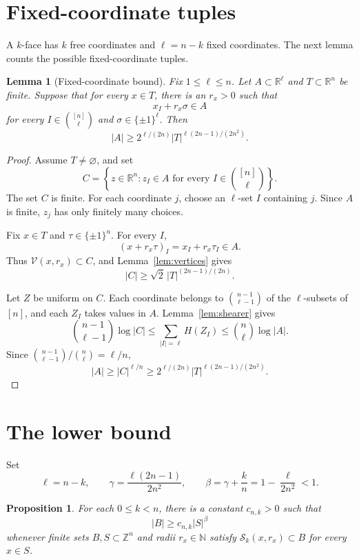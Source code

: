 \documentclass[11pt]{amsart}
\numberwithin{equation}{section}
\theoremstyle{plain}
\newtheorem{lemma}[theorem]{Lemma}
\newtheorem{proposition}[theorem]{Proposition}
\theoremstyle{definition}
\newcommand{\R}{\mathbb{R}}
\newcommand{\Z}{\mathbb{Z}}
\newcommand{\N}{\mathbb{N}}
\newcommand{\cS}{\mathcal{S}}
\begin{document}
\section{Fixed-coordinate tuples}

A $k$-face has $k$ free coordinates and $\ell=n-k$ fixed coordinates.  The
next lemma counts the possible fixed-coordinate tuples.

\begin{lemma}[Fixed-coordinate bound]\label{lem:fixed}
Fix $1\leq\ell\leq n$.  Let $A\subset\R^\ell$ and $T\subset\R^n$ be finite.
Suppose that for every $x\in T$, there is an $r_x>0$ such that
\[
 x_I+r_x\sigma\in A
\]
for every $I\in\binom{[n]}{\ell}$ and $\sigma\in\{\pm1\}^\ell$.  Then
\[
 |A|\geq
 2^{\ell/(2n)}|T|^{\ell(2n-1)/(2n^2)}.
\]
\end{lemma}

\begin{proof}
Assume $T\neq\varnothing$, and set
\[
 C=\left\{z\in\R^n:z_I\in A
 \text{ for every }I\in\binom{[n]}{\ell}\right\}.
\]
The set $C$ is finite.  For each coordinate $j$, choose an $\ell$-set $I$
containing $j$.  Since $A$ is finite, $z_j$ has only finitely many choices.

Fix $x\in T$ and $\tau\in\{\pm1\}^n$.  For every $I$,
\[
 (x+r_x\tau)_I=x_I+r_x\tau_I\in A.
\]
Thus $\mathcal V(x,r_x)\subset C$, and Lemma~\ref{lem:vertices} gives
\[
 |C|\geq\sqrt2\,|T|^{(2n-1)/(2n)}.
\]

Let $Z$ be uniform on $C$.  Each coordinate belongs to
$\binom{n-1}{\ell-1}$ of the $\ell$-subsets of $[n]$, and each $Z_I$ takes
values in $A$.  Lemma~\ref{lem:shearer} gives
\[
 \binom{n-1}{\ell-1}\log|C|
 \leq\sum_{|I|=\ell}H(Z_I)
 \leq\binom{n}{\ell}\log|A|.
\]
Since
$\binom{n-1}{\ell-1}/\binom{n}{\ell}=\ell/n$,
\[
 |A|\geq|C|^{\ell/n}
 \geq2^{\ell/(2n)}|T|^{\ell(2n-1)/(2n^2)}.
\]
\end{proof}

\section{The lower bound}

Set
\[
 \ell=n-k,
 \qquad
 \gamma=\frac{\ell(2n-1)}{2n^2},
 \qquad
 \beta=\gamma+\frac{k}{n}=1-\frac{\ell}{2n^2}<1.
\]

\begin{proposition}\label{prop:lower}
For each $0\leq k<n$, there is a constant $c_{n,k}>0$ such that
\[
 |B|\geq c_{n,k}|S|^\beta
\]
whenever finite sets $B,S\subset\Z^n$ and radii $r_x\in\N$ satisfy
$\cS_k(x,r_x)\subset B$ for every $x\in S$.
\end{proposition}
\end{document}
